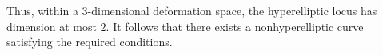 \documentclass[UTF8]{amsart}
\numberwithin{equation}{section}
\theoremstyle{plain}
\numberwithin{equation}{section}
\theoremstyle{remark}
\begin{document}
Thus, within a $3$-dimensional deformation space, the hyperelliptic locus has dimension at most $2$. It follows that there exists a nonhyperelliptic curve satisfying the required conditions.





\end{document}
